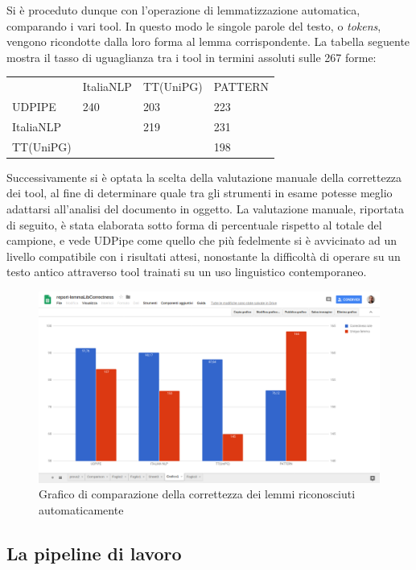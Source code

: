 Si è proceduto dunque con l'operazione di lemmatizzazione automatica,
comparando i vari tool. In questo modo le singole parole del testo, o
\emph{tokens}, vengono ricondotte dalla loro forma al lemma
corrispondente. La tabella seguente mostra il tasso di uguaglianza tra i
tool in termini assoluti sulle 267 forme:

\begin{longtable}[]{@{}llll@{}}
\toprule
& ItaliaNLP & TT(UniPG) & PATTERN\tabularnewline
UDPIPE & 240 & 203 & 223\tabularnewline
ItaliaNLP & & 219 & 231\tabularnewline
TT(UniPG) & & & 198\tabularnewline
\bottomrule
\end{longtable}

Successivamente si è optata la scelta della valutazione manuale della
correttezza dei tool, al fine di determinare quale tra gli strumenti in
esame potesse meglio adattarsi all'analisi del documento in oggetto. La
valutazione manuale, riportata di seguito, è stata elaborata sotto forma
di percentuale rispetto al totale del campione, e vede UDPipe come
quello che più fedelmente si è avvicinato ad un livello compatibile con
i risultati attesi, nonostante la difficoltà di operare su un testo
antico attraverso tool trainati su un uso linguistico contemporaneo.

\begin{figure}
\centering
\includegraphics[width=1.00000\textwidth]{../charts/correctnessLibLemma2.png}
\caption{Grafico di comparazione della correttezza dei lemmi
riconosciuti automaticamente}
\end{figure}

\subsection{La pipeline di lavoro}\label{la-pipeline-di-lavoro}

